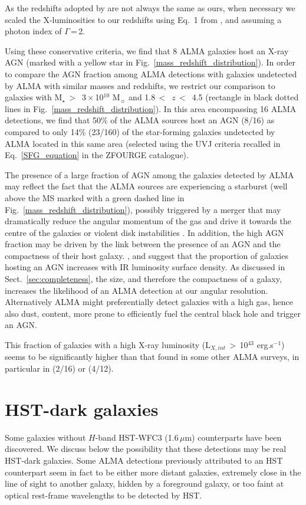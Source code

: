\documentclass[longauth]{aa}
\begin{document}
As the redshifts adopted by \cite{Luo2017} are not always the same as ours, when necessary we scaled the X-luminosities to our redshifts using Eq.~1 from \cite{Alexander2003}, and assuming a photon index of $\Gamma$\,=\,2.

Using these conservative criteria, we find that 8 ALMA galaxies host an X-ray AGN (marked with a yellow star in Fig.~\ref{mass_redshift_distribution}). In order to compare the AGN fraction among ALMA detections with galaxies undetected by ALMA with similar masses and redshifts, we restrict our comparison to galaxies with M$_\star$\,$>$\, 3\,$\times$\,10$^{10}$ M$_\sun$ and 1.8\,$<$\, $z$\,$<$\, 4.5 (rectangle in black dotted lines in Fig.~\ref{mass_redshift_distribution}). In this area encompassing 16 ALMA detections, we find that 50\% of the ALMA sources host an AGN (8/16) as compared to only 14\% (23/160) of the star-forming galaxies undetected by ALMA located in this same area (selected using the UVJ criteria recalled in Eq.~\ref{SFG_equation} in the ZFOURGE catalogue).

The presence of a large fraction of AGN among the galaxies detected by ALMA may reflect the fact that the ALMA sources are experiencing a starburst (well above the MS marked with a green dashed line in Fig.~\ref{mass_redshift_distribution}), possibly triggered by a merger that may dramatically reduce the angular momentum of the gas and drive it towards the centre of the galaxies \cite[e.g.,][] {Rovilos2012, Gatti2015, Lamastra2013} or violent disk instabilities \citep{Bournaud2012}. In addition, the high AGN fraction may be driven by the link between the presence of an AGN and the compactness of their host galaxy. \cite{Elbaz2017}, \mbox{\cite{Chang2017}} and \mbox{\cite{Ueda2018}} suggest that the proportion of galaxies hosting an AGN increases with IR luminosity surface density. As discussed in Sect.~\ref{sec:completeness}, the size, and therefore the compactness of a galaxy, increases the likelihood of an ALMA detection at our angular resolution.
Alternatively ALMA might preferentially detect galaxies with a high gas, hence also dust, content, more prone to efficiently fuel the central black hole and trigger an AGN.

This fraction of galaxies with a high X-ray luminosity (L$_{X,int}$\,$>$\,10$^{43}$ erg.s$^{-1}$) seems to be significantly higher than that found in some other ALMA surveys, in particular  in \cite{Dunlop2017} (2/16) or \cite{Ueda2018} (4/12).

\section{HST-dark galaxies}\label{sec:HST-dark}
Some galaxies without $H$-band HST-WFC3 (1.6\,$\mu$m) counterparts have been discovered. We discuss below the possibility that these detections may be real HST-dark galaxies. Some ALMA detections previously attributed to an HST counterpart seem in fact to be either more distant galaxies, extremely close in the line of sight to another galaxy, hidden by a foreground galaxy, or too faint at optical rest-frame wavelengths to be detected by HST.
\end{document}
